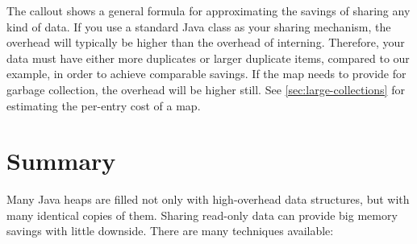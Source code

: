 
The callout shows a general formula for approximating the savings of sharing any
kind of data.  
If you use a standard Java
 class as your sharing mechanism, the overhead will typically be
higher than the overhead of  interning.
Therefore, your data must have either more duplicates or
larger duplicate items, compared to our example, in order to achieve comparable
savings. If the map needs to provide for garbage collection, the overhead will
be higher still.
See \autoref{sec:large-collections}
for estimating the per-entry cost of a map.

\section{Summary} 
Many Java heaps are filled not only with high-overhead data structures, but
with many identical copies of them. Sharing read-only
data can provide big memory savings with little downside. There are many
techniques available:

